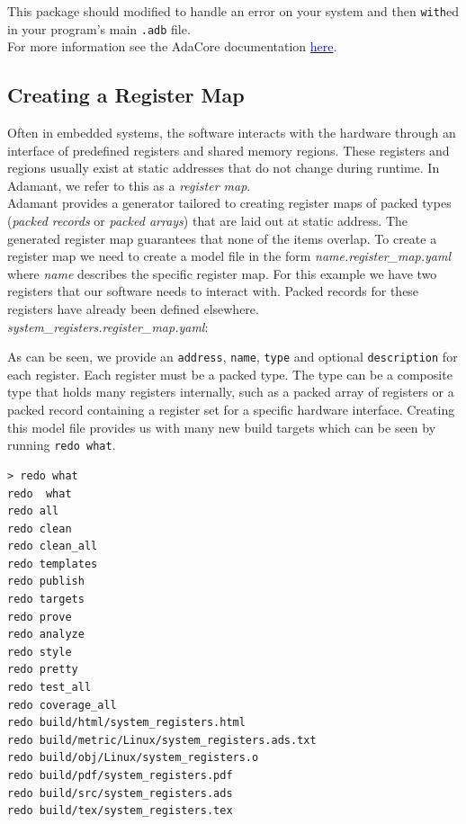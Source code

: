 This package should modified to handle an error on your system and then \texttt{with}ed in your program's main \texttt{.adb} file. \\

For more information see the AdaCore documentation \href{https://docs.adacore.com/gnathie_ug-docs/html/gnathie_ug/gnathie_ug/the_predefined_profiles.html#exceptions-and-the-last-chance-handler-zfp-and-ravenscar-sfp}{\textcolor{blue}{here}}.

\subsection{Creating a Register Map} \label{Creating a Register Map}

Often in embedded systems, the software interacts with the hardware through an interface of predefined registers and shared memory regions. These registers and regions usually exist at static addresses that do not change during runtime. In Adamant, we refer to this as a \textit{register map}. \\

Adamant provides a generator tailored to creating register maps of packed types (\textit{packed records} or \textit{packed arrays}) that are laid out at static address. The generated register map guarantees that none of the items overlap. To create a register map we need to create a model file in the form \textit{name.register\_map.yaml} where \textit{name} describes the specific register map. For this example we have two registers that our software needs to interact with. Packed records for these registers have already been defined elsewhere. \\

\textit{system\_registers.register\_map.yaml}:

As can be seen, we provide an \texttt{address}, \texttt{name}, \texttt{type} and optional \texttt{description} for each register. Each register must be a packed type. The type can be a composite type that holds many registers internally, such as a packed array of registers or a packed record containing a register set for a specific hardware interface. Creating this model file provides us with many new build targets which can be seen by running \texttt{redo what}.

\vspace{5mm} %
\begin{verbatim}
> redo what
redo  what
redo all
redo clean
redo clean_all
redo templates
redo publish
redo targets
redo prove
redo analyze
redo style
redo pretty
redo test_all
redo coverage_all
redo build/html/system_registers.html
redo build/metric/Linux/system_registers.ads.txt
redo build/obj/Linux/system_registers.o
redo build/pdf/system_registers.pdf
redo build/src/system_registers.ads
redo build/tex/system_registers.tex
\end{verbatim}
\vspace{5mm} %

